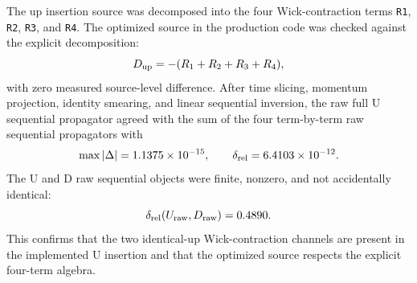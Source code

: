 \documentclass[11pt,a4paper]{article}
\begin{document}
The up insertion source was decomposed into the four Wick-contraction terms
\texttt{R1}, \texttt{R2}, \texttt{R3}, and \texttt{R4}.  The optimized source in
the production code was checked against the explicit decomposition:
\begin{equation}
  D_{\rm up} = -(R_{1}+R_{2}+R_{3}+R_{4}),
\end{equation}
with zero measured source-level difference.  After time slicing, momentum
projection, identity smearing, and linear sequential inversion, the raw full U
sequential propagator agreed with the sum of the four term-by-term raw sequential
propagators with
\begin{equation}
  \max|\Delta| = 1.1375\times 10^{-15},\qquad
  \delta_{\rm rel} = 6.4103\times 10^{-12}.
\end{equation}
The U and D raw sequential objects were finite, nonzero, and not accidentally
identical:
\begin{equation}
  \delta_{\rm rel}(U_{\rm raw},D_{\rm raw}) = 0.4890.
\end{equation}
This confirms that the two identical-up Wick-contraction channels are present in
the implemented U insertion and that the optimized source respects the explicit
four-term algebra.

\end{document}
